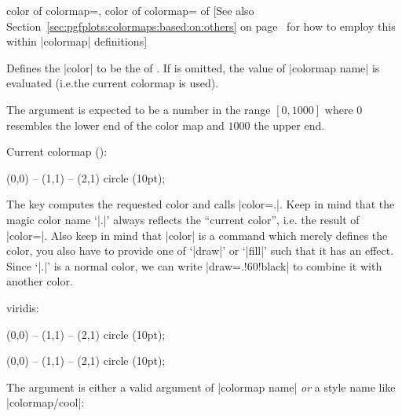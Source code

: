 \begin{pgfplotskeylist}{%
    color of colormap=,
    color of colormap= of %
}
    [See also Section~\ref{sec:pgfplots:colormaps:based:on:others} on
    page~\pageref{sec:pgfplots:colormaps:based:on:others} for how to employ
    this within |colormap| definitions]

    Defines the \tikzname{} |color| to be the  of . If  is omitted, the value of |colormap name| is
    evaluated (i.e.\@ the current colormap is used).

    The argument  is expected to be a number in the range
    $[0,1000]$ where $0$ resembles the lower end of the color map and $1000$
    the upper end.

    Current colormap (): 

\begin{codeexample}[]
\tikz\fill [color of colormap={800}, thick,
    draw=.!60!black]
        (0,0) -- (1,1) -- (2,1) circle (10pt);
\end{codeexample}

    The key computes the requested color and calls |color=.|. Keep in mind that
    the magic color name `|.|' always reflects the ``current color'', i.e.\@
    the result of |color=|. Also keep in mind that |color| is
    a \tikzname{} command which merely defines the color, you also have to
    provide one of `|draw|' or `|fill|' such that it has an effect. Since `|.|'
    is a normal color, we can write |draw=.!60!black| to combine it with
    another color.

    viridis: 

\begin{codeexample}[]
\pgfplotsset{colormap name=viridis}
\tikz\fill [color of colormap={1000},thick,
    draw=.!60!black]
        (0,0) -- (1,1) -- (2,1) circle (10pt);
\end{codeexample}

\begin{codeexample}[]
\tikz\fill [color of colormap={300 of viridis},thick,
    draw=.!60!black]
        (0,0) -- (1,1) -- (2,1) circle (10pt);
\end{codeexample}

    The argument  is either a valid argument of
    |colormap name| \emph{or} a style name like |colormap/cool|:


\end{pgfplotskeylist}
